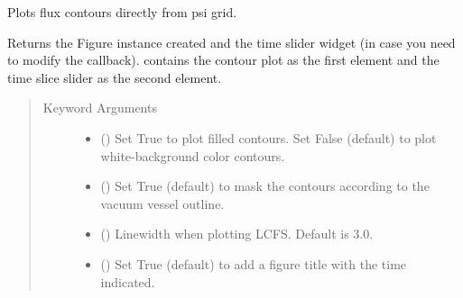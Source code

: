 \documentclass[letterpaper,10pt,english]{sphinxmanual}
\begin{document}
\begin{fulllineitems}
\begin{fulllineitems}
\label{\detokenize{eqtools:eqtools.core.Equilibrium.plotFlux}}
Plots flux contours directly from psi grid.

Returns the Figure instance created and the time slider widget (in case
you need to modify the callback).  contains the contour plot as
the first element and the time slice slider as the second element.
\begin{quote}\begin{description}
\item[{Keyword Arguments}] \leavevmode\begin{itemize}
\item {} 
 () \textendash{} Set True to plot filled contours.  Set False (default) to plot white-background
color contours.

\item {} 
 () \textendash{} Set True (default) to mask the contours according to the vacuum
vessel outline.

\item {} 
 () \textendash{} Linewidth when plotting LCFS. Default is 3.0.

\item {} 
 () \textendash{} Set True (default) to add a figure title with the time indicated.

\end{itemize}

\end{description}\end{quote}

\end{fulllineitems}


\end{fulllineitems}
\end{document}
